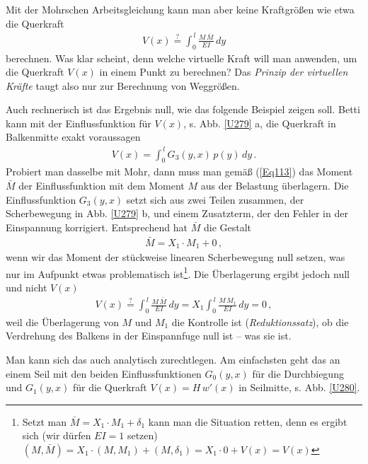 {{{{Mit der Mohrschen Arbeitsgleichung kann man aber keine Kraftgr\"{o}{\ss}en wie etwa die Querkraft
\begin{align}\label{Eq113}
V(x)  \overset{?}{=} \int_0^{\,l} \frac{M\,\bar{M}}{EI}\,dy
\end{align}
berechnen. Was klar scheint, denn welche virtuelle Kraft will man anwenden, um die Querkraft $V(x)$ in einem Punkt zu berechnen? Das {\em Prinzip der virtuellen Kr\"{a}fte\/} taugt also nur zur Berechnung von Weggr\"{o}{\ss}en.

Auch rechnerisch ist das Ergebnis null, wie das folgende Beispiel zeigen soll. Betti kann mit der Einflussfunktion f\"{u}r $V(x)$, s. Abb. \ref{U279} a, die Querkraft in Balkenmitte exakt voraussagen
\begin{align}
V(x) = \int_0^{\,l} G_3(y,x)\,p(y)\,dy\,.
\end{align}
Probiert man dasselbe mit Mohr, dann muss man gem\"{a}{\ss} (\ref{Eq113}) das Moment $\bar{M}$ der Einflussfunktion mit dem Moment $M$ aus der Belastung \"{u}berlagern. Die Einflussfunktion $G_3(y,x)$ setzt sich aus zwei Teilen zusammen, der Scherbewegung in Abb.  \ref{U279} b, und einem Zusatzterm, der den Fehler in der Einspannung korrigiert. Entsprechend hat $\bar{M}$ die Gestalt
\begin{align}
\bar{M} = X_1 \cdot M_1 + 0\,,
\end{align}
wenn wir das Moment der st\"{u}ckweise linearen Scherbewegung null setzen, was nur im Aufpunkt etwas problematisch ist\footnote{Setzt man $\bar{M} = X_1 \cdot M_1 + \delta_1$ kann man die Situation retten, denn es ergibt sich   (wir d\"{u}rfen $EI = 1$ setzen) $(M,\bar{M}) = X_1 \cdot (M,M_1) + (M,\delta_1) = X_1 \cdot 0 + V(x) = V(x)$}. Die \"{U}berlagerung ergibt jedoch null und nicht $V(x)$
\begin{align}
V(x) \overset{?}{=} \int_0^{\,l} \frac{M\,\bar{M}}{EI}\,dy = X_1 \int_0^{\,l} \frac{M\,M_1}{EI}\,dy = 0\,,
\end{align}
weil die \"{U}berlagerung von $M$ und $M_1$ die Kontrolle ist ({\em Reduktionssatz\/}), ob die Verdrehung des Balkens in der Einspannfuge null ist -- was sie ist.

Man kann sich das auch analytisch zurechtlegen. Am einfachsten geht das an einem Seil mit den beiden Einflussfunktionen $G_0(y,x)$ f\"{u}r die Durchbiegung und $G_1(y,x)$ f\"{u}r die Querkraft $V(x) = H\,w'(x)$ in Seilmitte, s. Abb. \ref{U280}.

}}}}
